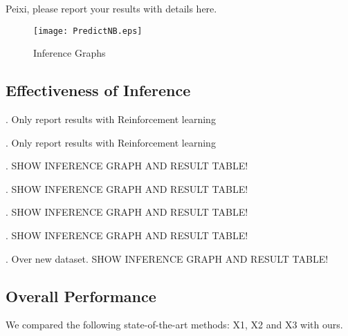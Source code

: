 {\color{red} Peixi, please report your results with details here.}



\begin{figure}[tb!]
\centering
\texttt{[image: PredictNB.eps]}
\vspace{-2ex}
\caption{Inference Graphs}
\vspace{-2ex}
\label{fig:inferG}
\end{figure}

\subsection{Effectiveness of Inference} 

. Only report results with Reinforcement learning 

. Only report results with Reinforcement learning 

. {\color{red} SHOW INFERENCE GRAPH AND RESULT TABLE!}

. {\color{red} SHOW INFERENCE GRAPH AND RESULT TABLE!}

. {\color{red} SHOW INFERENCE GRAPH AND RESULT TABLE!}

. {\color{red} SHOW INFERENCE GRAPH AND RESULT TABLE!}

. {\color{red} Over new dataset. SHOW INFERENCE GRAPH AND RESULT TABLE!}

\subsection{Overall Performance}
\label{sec-overall-performance}

We compared the following state-of-the-art methods: X1, X2 and X3 with ours. 